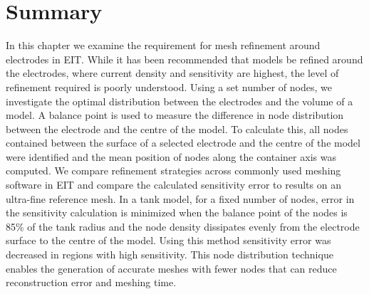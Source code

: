 %

\section{Summary}
In this chapter we examine the requirement for mesh refinement around 
electrodes in EIT. 
While it has been recommended that  models be refined around the electrodes, where current
density and sensitivity are highest,  the level of refinement required is poorly understood. 
Using a set number of nodes, we investigate the optimal distribution 
between the electrodes and 
the volume of a model. 
A balance point is used to measure the difference in node distribution between the electrode and the centre of
the model.
To calculate this, all nodes contained between the surface of a selected electrode and the centre of the model 
were identified and the mean position of nodes along the container axis was computed. 
We compare refinement strategies across commonly used meshing software in EIT and compare the 
calculated sensitivity error to results on an ultra-fine reference mesh. 
In a tank model, for a fixed number of nodes, error in the sensitivity calculation is minimized 
when the balance point of the nodes is 85\% of the tank radius and the node density dissipates evenly 
from the electrode surface to the centre of the model. Using this method sensitivity error was decreased 
in regions with high sensitivity. This node distribution technique  enables the generation  of accurate 
meshes with fewer nodes that can reduce reconstruction error and meshing time. 
